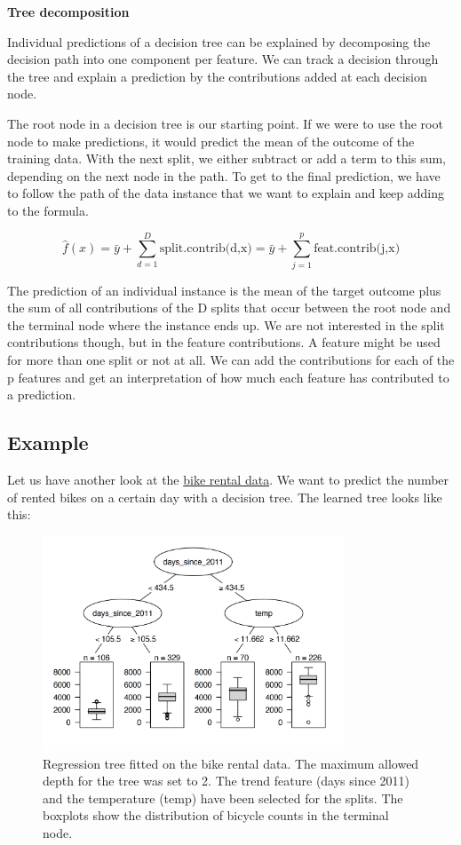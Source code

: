 \documentclass[
  10pt,
]{scrbook}
\begin{document}
\textbf{Tree decomposition}

Individual predictions of a decision tree can be explained by decomposing the decision path into one component per feature.
We can track a decision through the tree and explain a prediction by the contributions added at each decision node.

The root node in a decision tree is our starting point.
If we were to use the root node to make predictions, it would predict the mean of the outcome of the training data.
With the next split, we either subtract or add a term to this sum, depending on the next node in the path.
To get to the final prediction, we have to follow the path of the data instance that we want to explain and keep adding to the formula.

\[\hat{f}(x)=\bar{y}+\sum_{d=1}^D\text{split.contrib(d,x)}=\bar{y}+\sum_{j=1}^p\text{feat.contrib(j,x)}\]

The prediction of an individual instance is the mean of the target outcome plus the sum of all contributions of the D splits that occur between the root node and the terminal node where the instance ends up.
We are not interested in the split contributions though, but in the feature contributions.
A feature might be used for more than one split or not at all.
We can add the contributions for each of the p features and get an interpretation of how much each feature has contributed to a prediction.

\hypertarget{example-2}{%
\subsection{Example}\label{example-2}}

Let us have another look at the \protect\hyperlink{bike-data}{bike rental data}.
We want to predict the number of rented bikes on a certain day with a decision tree.
The learned tree looks like this:

\begin{figure}

{\centering \includegraphics[width=0.8\textwidth]{images/tree-example-1} 

}

\caption{Regression tree fitted on the bike rental data. The maximum allowed depth for the tree was set to 2. The trend feature (days since 2011) and the temperature (temp) have been selected for the splits. The boxplots show the distribution of bicycle counts in the terminal node.}\label{fig:tree-example}
\end{figure}
\end{document}
